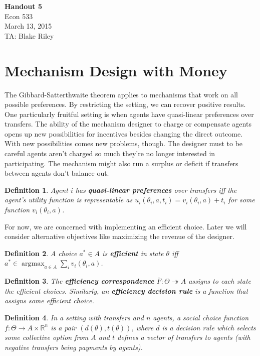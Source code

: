 \documentclass[letter, 10pt]{article}
\theoremstyle{basic}
\newtheorem{definition}{Definition}[section]
\newcommand{\R}{\mathbb{R}}
\newcommand{\tto}{\twoheadrightarrow}
\begin{document}
\begin{spacing}{1.0}

\noindent
\textbf{Handout 5} \\
Econ 533 \\
March 13, 2015 \\
TA: Blake Riley \\

\section{Mechanism Design with Money}
\label{sec:vick-clarke-grov}

The Gibbard-Satterthwaite theorem applies to mechanisms that work on all possible
preferences. By restricting the setting, we can recover positive results. One
particularly fruitful setting is when agents have quasi-linear preferences over
transfers. The ability of the mechanism designer to charge or compensate agents opens
up new possibilities for incentives besides changing the direct outcome. With new
possibilities comes new problems, though. The designer must to be careful agents
aren't charged so much they're no longer interested in participating. The mechanism
might also run a surplus or deficit if transfers between agents don't balance out.

\begin{definition}
  Agent $i$ has \textbf{quasi-linear preferences} over transfers iff the
  agent's utility function is representable as $u_i(\theta_i, a, t_i) =
  v_i(\theta_i,a)+t_i$ for some function $v_i(\theta_i,a)$.
\end{definition}

For now, we are concerned with implementing an efficient choice. Later we
will consider alternative objectives like maximizing the revenue of the
designer.

\begin{definition}
  A choice $a^* \in A$ is \textbf{efficient} in state $\theta$ iff $a^* \in
  \operatorname{argmax}_{a\in A} \sum_i v_i(\theta_i, a)$.
\end{definition}

\begin{definition}
  The \textbf{efficiency correspondence} $\bar{F}:\Theta \tto A$ assigns to
  each state the efficient choices. Similarly, an \textbf{efficiency
    decision rule} is a function that assigns some efficient choice.
\end{definition}

\begin{definition}
  In a setting with transfers and $n$ agents, a social choice function
  $f:\Theta \to A\times \R^n$ is a pair $(d(\theta), t(\theta))$, where $d$
  is a decision rule which selects some collective option from $A$ and $t$
  defines a vector of transfers to agents (with negative transfers being
  payments by agents).
\end{definition}


\end{spacing}
\end{document}
